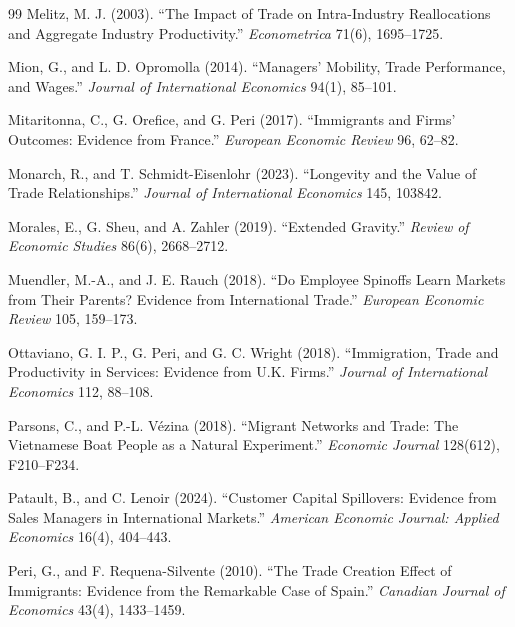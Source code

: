 \documentclass[12pt]{article}
\theoremstyle{remark}
\begin{document}
\begin{thebibliography}{99}
Melitz, M. J. (2003). ``The Impact of Trade on Intra-Industry Reallocations and Aggregate Industry Productivity.'' \textit{Econometrica} 71(6), 1695--1725.

Mion, G., and L. D. Opromolla (2014). ``Managers' Mobility, Trade Performance, and Wages.'' \textit{Journal of International Economics} 94(1), 85--101.

Mitaritonna, C., G. Orefice, and G. Peri (2017). ``Immigrants and Firms' Outcomes: Evidence from France.'' \textit{European Economic Review} 96, 62--82.

Monarch, R., and T. Schmidt-Eisenlohr (2023). ``Longevity and the Value of Trade Relationships.'' \textit{Journal of International Economics} 145, 103842.

Morales, E., G. Sheu, and A. Zahler (2019). ``Extended Gravity.'' \textit{Review of Economic Studies} 86(6), 2668--2712.

Muendler, M.-A., and J. E. Rauch (2018). ``Do Employee Spinoffs Learn Markets from Their Parents? Evidence from International Trade.'' \textit{European Economic Review} 105, 159--173.

Ottaviano, G. I. P., G. Peri, and G. C. Wright (2018). ``Immigration, Trade and Productivity in Services: Evidence from U.K. Firms.'' \textit{Journal of International Economics} 112, 88--108.

Parsons, C., and P.-L. V\'ezina (2018). ``Migrant Networks and Trade: The Vietnamese Boat People as a Natural Experiment.'' \textit{Economic Journal} 128(612), F210--F234.

Patault, B., and C. Lenoir (2024). ``Customer Capital Spillovers: Evidence from Sales Managers in International Markets.'' \textit{American Economic Journal: Applied Economics} 16(4), 404--443.

Peri, G., and F. Requena-Silvente (2010). ``The Trade Creation Effect of Immigrants: Evidence from the Remarkable Case of Spain.'' \textit{Canadian Journal of Economics} 43(4), 1433--1459.


\end{thebibliography}
\end{document}
